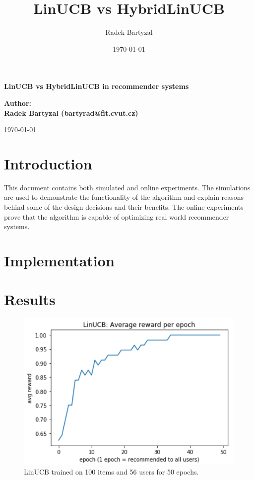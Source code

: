 \documentclass[12pt, titlepage]{article}
\title{LinUCB vs HybridLinUCB}
\date{\today}
\author{Radek Bartyzal}
\begin{document}
\begin{titlepage}
    \centering
    \vfill
    {\bfseries\Huge
        LinUCB vs HybridLinUCB in recommender systems
    }    
    \vfill
        
    
        
    {\bfseries\Large 
    Author:\\
    Radek Bartyzal (bartyrad@fit.cvut.cz)\\
    }    
    \vskip1cm
 
    \vskip1cm
    \today

    
    \vfill
\end{titlepage}

\tableofcontents
\pagebreak

\section{Introduction}\label{sec:intro}
This document contains both simulated and online experiments.
The simulations are used to demonstrate the functionality of the algorithm and explain reasons behind some of the design decisions and their benefits.
The online experiments prove that the algorithm is capable of optimizing real world recommender systems.

\section{Implementation}\label{sec:impl}



\section{Results}\label{sec:results}

\begin{figure}[h]
 \centering
 \includegraphics[width=\columnwidth]{img/LinUCB-100items-50epochs}
 \caption{LinUCB trained on 100 items and 56 users for 50 epochs.}
 \label{fig:linUCB}
\end{figure}
\end{document}
